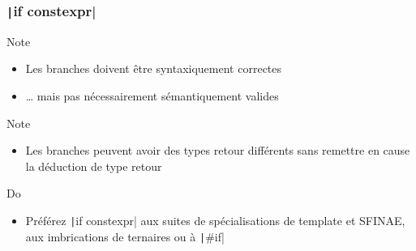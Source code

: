 \documentclass[C++.tex]{subfiles}
\begin{document}
\begin{frame}[fragile]
	\frametitle{\texttt|if constexpr|}
	\begin{block}{Note}
		\begin{itemize}
			\item Les branches doivent être syntaxiquement correctes
			\item \ldots{} mais pas nécessairement sémantiquement valides
		\end{itemize}
	\end{block}

	\begin{block}{Note}
		\begin{itemize}
			\item Les branches peuvent avoir des types retour différents sans remettre en cause la déduction de type retour
		\end{itemize}
	\end{block}

	\begin{exampleblock}{Do}
		\begin{itemize}
			\item Préférez \texttt|if constexpr| aux suites de spécialisations de template et SFINAE, aux imbrications de ternaires ou à \texttt|#if|
		\end{itemize}
	\end{exampleblock}
\end{frame}
\end{document}
